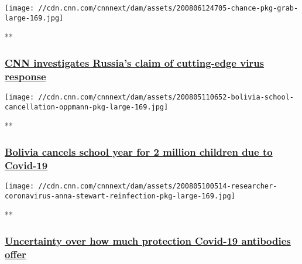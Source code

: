 \texttt{[image: //cdn.cnn.com/cnnnext/dam/assets/200806124705-chance-pkg-grab-large-169.jpg]}

**

\hypertarget{cnn-investigates-russias-claim-of-cutting-edge-virus-response}{%
\subsubsection{\texorpdfstring{\href{/videos/world/2020/08/06/russia-vaccine-testing-matthew-chance-pkg-newday-intl-ldn-vpx.cnn/video/playlists/coronavirus-intl/}{CNN
investigates Russia's claim of cutting-edge virus
response}}{CNN investigates Russia's claim of cutting-edge virus response}}\label{cnn-investigates-russias-claim-of-cutting-edge-virus-response}}

\href{/videos/world/2020/08/05/bolivia-schools-closed-coronavirus-covid-19-pandemic-cases-latin-america-oppmann-pkg-intl-ldn-vpx.cnn/video/playlists/coronavirus-intl/}{}

\texttt{[image: //cdn.cnn.com/cnnnext/dam/assets/200805110652-bolivia-school-cancellation-oppmann-pkg-large-169.jpg]}

**

\hypertarget{bolivia-cancels-school-year-for-2-million-children-due-to-covid-19}{%
\subsubsection{\texorpdfstring{\href{/videos/world/2020/08/05/bolivia-schools-closed-coronavirus-covid-19-pandemic-cases-latin-america-oppmann-pkg-intl-ldn-vpx.cnn/video/playlists/coronavirus-intl/}{Bolivia
cancels school year for 2 million children due to
Covid-19}}{Bolivia cancels school year for 2 million children due to Covid-19}}\label{bolivia-cancels-school-year-for-2-million-children-due-to-covid-19}}

\href{/videos/world/2020/08/05/coronavirus-covid-19-pandemic-testing-antibodies-stewart-pkg-nr-intl-lnd-vpx.cnn/video/playlists/coronavirus-intl/}{}

\texttt{[image: //cdn.cnn.com/cnnnext/dam/assets/200805100514-researcher-coronavirus-anna-stewart-reinfection-pkg-large-169.jpg]}

**

\hypertarget{uncertainty-over-how-much-protection-covid-19-antibodies-offer}{%
\subsubsection{\texorpdfstring{\href{/videos/world/2020/08/05/coronavirus-covid-19-pandemic-testing-antibodies-stewart-pkg-nr-intl-lnd-vpx.cnn/video/playlists/coronavirus-intl/}{Uncertainty
over how much protection Covid-19 antibodies
offer}}{Uncertainty over how much protection Covid-19 antibodies offer}}\label{uncertainty-over-how-much-protection-covid-19-antibodies-offer}}

